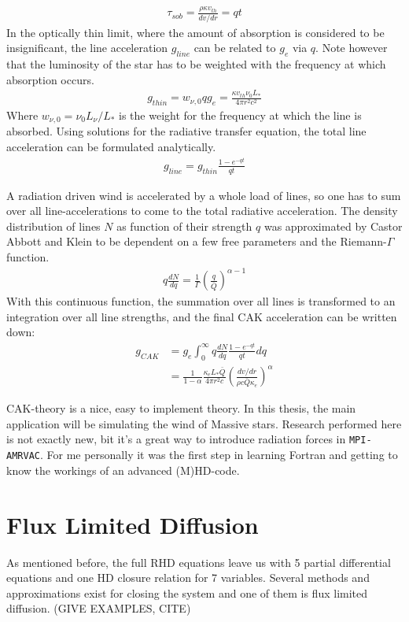 \begin{align}
\tau_{sob} = \frac{\rho \kappa v_{th}}{dv/dr} = qt
\end{align}
In the optically thin limit, where the amount of absorption is considered to be insignificant, the line acceleration $g_{line}$ can be related to $g_e$ via $q$. Note however that the luminosity of the star has to be weighted with the frequency at which absorption occurs. 
\begin{align}
g_{thin} = w_{\nu,0} q g_e = \frac{\kappa v_{th} \nu_0 L_*}{4 \pi r^2 c^2}
\end{align}
Where $w_{\nu,0} = \nu_0 L_\nu / L_*$ is the weight for the frequency at which the line is absorbed. Using solutions for the radiative transfer equation, the total line acceleration can be formulated analytically.
\begin{align}
g_{line} = g_{thin} \frac{1 - e^{-qt}}{qt} 
\end{align}

A radiation driven wind is accelerated by a whole load of lines, so one has to sum over all line-accelerations to come to the total radiative acceleration. The density distribution of lines $N$ as function of their strength $q$ was approximated by Castor Abbott and Klein to be dependent on a few free parameters and the Riemann-$\Gamma$ function.
\begin{align} 
q \frac{dN}{dq} = \frac{1}{\Gamma} \left(\frac{q}{\bar{Q}} \right)^{\alpha - 1}
\end{align}
With this continuous function, the summation over all lines is transformed to an integration over all line strengths, and the final CAK acceleration can be written down:
\begin{align}
g_{CAK} &= g_e \int_0^\infty q \frac{dN}{dq} \frac{1 - e^{-qt}}{qt} dq \\
        &= \frac{1}{1-\alpha} \frac{\kappa_e L_* \bar{Q}}{4\pi r^2 c} \left( \frac{dv/dr}{\rho c \bar{Q} \kappa_e} \right)^\alpha \label{g_CAK}
\end{align}

CAK-theory is a nice, easy to implement theory. In this thesis, the main application will be simulating the wind of Massive stars. Research performed here is not exactly new, bit it's a great way to introduce radiation forces in \texttt{MPI-AMRVAC}. For me personally it was the first step in learning Fortran and getting to know the workings of an advanced (M)HD-code.


\section{Flux Limited Diffusion} \label{section: introduction Flux Limited Diffusion}
As mentioned before, the full RHD equations leave us with 5 partial differential equations and one HD closure relation for 7 variables. Several methods and approximations exist for closing the system and one of them is flux limited diffusion. (GIVE EXAMPLES, CITE)\\

